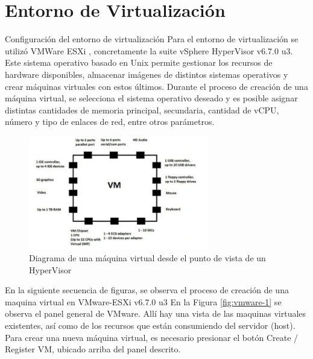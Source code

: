 \appendix
\chapter{\Large Entorno de Virtualización}
    \begin{section}{Configuración del entorno de virtualización}
        Para el entorno de virtualización se utilizó VMWare ESXi \cite{vmware}, concretamente la suite vSphere HyperVisor v6.7.0 u3. Este sistema operativo basado en Unix permite gestionar los recursos de hardware disponibles, almacenar imágenes de distintos sistemas operativos y crear máquinas virtuales con estos últimos. Durante el proceso de creación de una máquina virtual, se selecciona el sistema operativo deseado y es posible asignar distintas cantidades de memoria principal, secundaria, cantidad de vCPU, número y tipo de enlaces de red, entre otros parámetros. \par
         \begin{figure}[H]
          \centering
           \includegraphics[width=0.7\textwidth]{./iteracion_1_imagenes/figura_34_diagrama_VM.png}
            \caption{ Diagrama de una máquina virtual desde el punto de vista de un HyperVisor}
            \label{fig:maquina_virtual}
        \end{figure}
        En la siguiente secuencia de figuras, se observa el proceso de creación de una maquina virtual en VMware-ESXi v6.7.0 u3 
        En la Figura \ref{fig:vmware-1} se observa el panel general de VMware. Allí hay una vista de las maquinas virtuales existentes, así como de los recursos que están consumiendo del servidor (host). Para crear una nueva máquina virtual, es necesario presionar el botón Create / Register VM, ubicado arriba del panel descrito.
        \begin{figure}[H]

\end{figure}
\end{section}
